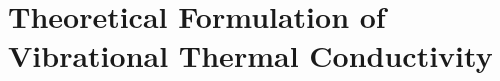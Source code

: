 \documentclass[aps,prb,twocolumn,superscriptaddress,footinbib,amsmath,amssymb,floatfix]{revtex4}
\begin{document}


\section{\label{S:Theory:Thermal}Theoretical Formulation of 
Vibrational Thermal Conductivity}
\end{document}

